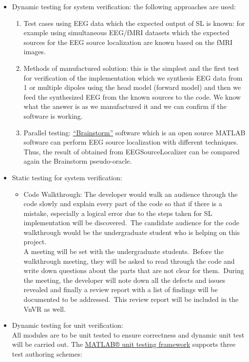 \documentclass[12pt, titlepage]{article}
\renewcommand{\progname}{EEGSourceLocalizer}
\begin{document}
\begin{itemize}
\item Dynamic testing for system verification: the following approaches are used:
	\begin{enumerate} 
	\item Test cases using EEG data which the expected output of SL is known: for example using simultaneous EEG/fMRI datasets which the expected sources for the EEG source localization are known based on the fMRI images.
	\item Methods of manufactured solution: this is the simplest and the first test for verification of the implementation which we synthesis EEG data from 1 or multiple dipoles using the head model (forward model) and then we feed the synthesized EEG from the known sources to the code. We know what the answer is as we manufactured it and we can confirm if the software is working.
	\item Parallel testing: \href{https://neuroimage.usc.edu/brainstorm/Introduction} {\enquote{Brainstorm}} software which is an open source MATLAB software can perform EEG source localization with different techniques. Thus, the result of obtained from \progname{} can be compared again the Brainstorm pseudo-oracle.
	\end{enumerate}
	
\item Static testing for system verification: 
	\begin{itemize} 
	\item Code Walkthrough: The developer would walk an audience through the code slowly and explain every part of the code so that if there is a mistake, especially a logical error due to the steps taken for SL implementation will be discovered.\ The candidate audience for the code walkthrough would  be the undergraduate student who is helping on this project. \\
	A meeting will be set with the undergraduate students.\ Before the walkthrough meeting, they will be asked to read through the code and write down questions about the parts that are not clear for them.\ During the meeting, the developer will note down all the defects and issues revealed and finally a review report with a list of findings will be documented to be addressed.\ This review report will be included in the VnVR as well.
	\end{itemize}
	
\item Dynamic testing for unit verification: \\
All modules are to be unit tested to ensure correctness and dynamic unit test will be carried out. The \href{https://www.mathworks.com/help/matlab/matlab_prog/ways-to-write-unit-tests.html}{MATLAB® unit testing framework} supports three test authoring schemes:


\end{itemize}
\end{document}
